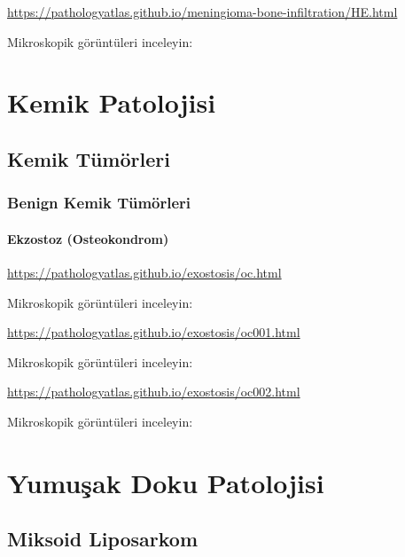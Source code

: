 \documentclass[
  letterpaper,
  DIV=11,
  numbers=noendperiod]{scrreprt}
\begin{document}
\url{https://pathologyatlas.github.io/meningioma-bone-infiltration/HE.html}

Mikroskopik görüntüleri inceleyin:

\part{Kemik Patolojisi}

\hypertarget{kemik-tuxfcmuxf6rleri}{%
\chapter{Kemik Tümörleri}\label{kemik-tuxfcmuxf6rleri}}

\hypertarget{benign-kemik-tuxfcmuxf6rleri}{%
\section{Benign Kemik Tümörleri}\label{benign-kemik-tuxfcmuxf6rleri}}

\hypertarget{ekzostoz-osteokondrom}{%
\subsection{Ekzostoz (Osteokondrom)}\label{ekzostoz-osteokondrom}}

\url{https://pathologyatlas.github.io/exostosis/oc.html}

Mikroskopik görüntüleri inceleyin:

\url{https://pathologyatlas.github.io/exostosis/oc001.html}

Mikroskopik görüntüleri inceleyin:

\url{https://pathologyatlas.github.io/exostosis/oc002.html}

Mikroskopik görüntüleri inceleyin:

\hypertarget{section-1}{%
\subsection{}\label{section-1}}

\part{Yumuşak Doku Patolojisi}

\hypertarget{miksoid-liposarkom}{%
\chapter{Miksoid Liposarkom}\label{miksoid-liposarkom}}
\end{document}
